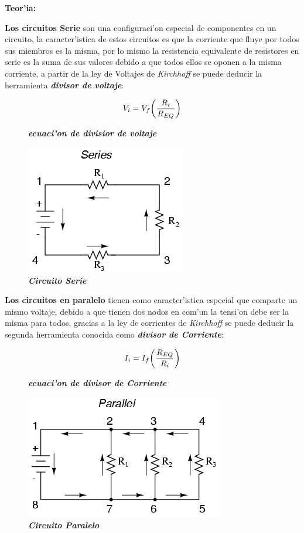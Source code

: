 \documentclass[11pt, letterpaper]{report}
\newenvironment{block}[1]{\hspace{-0.8 cm}\textbf{\Large #1}}{\vspace{3 mm}} %
\begin{document}
	\begin{block}{Teor'ia:}
	
	  \textbf{Los circuitos Serie} son una configuraci'on especial de componentes en un circuito, la caracter'istica de estos circuitos es que la corriente que fluye por todos sus miembros es la misma, por lo mismo la resistencia equivalente de resistores en serie es la suma de sus valores debido a que todos ellos se oponen a la misma corriente, a partir de la ley de Voltajes de \emph{Kirchhoff} se puede deducir la herramienta \textbf{\emph{divisor de voltaje}}:
	  
	  \begin{figure}[H] %
	  \[V_i = V_f \biggl( \frac{R_i}{R_{\tiny EQ}} \biggr)\]
	  \caption{\textbf{\emph{ecuaci'on de divisior de voltaje}}}
	  \end{figure}
	  
	\begin{figure}[H]
	\hfill\includegraphics[scale=0.5]{serie.png}\hspace*{\fill}
	\caption{\textbf{\emph{Circuito Serie}}}
	\end{figure}
	
	\textbf{Los circuitos en paralelo} tienen como caracter'istica especial que comparte un mismo voltaje, debido a que tienen dos nodos en com'un la tensi'on debe ser la misma para todos, gracias a la ley de corrientes de \emph{Kirchhoff} se puede deducir la segunda herramienta conocida como \textbf{\emph{divisor de Corriente}}:

		\begin{figure}[H]
		\[I_i = I_f \biggl( \frac{R_{\tiny EQ}}{R_i} \biggr)\]
		\caption{\textbf{\emph{ecuaci'on de divisor de Corriente}}}
		\end{figure}
	
		 \begin{figure}[H]
		 \hfill\includegraphics[scale=.5]{paralelo.png}\hspace*{\fill}
		 \caption{\textbf{\emph{Circuito Paralelo}}}
		 \end{figure}
	\end{block}
		
\end{document}
